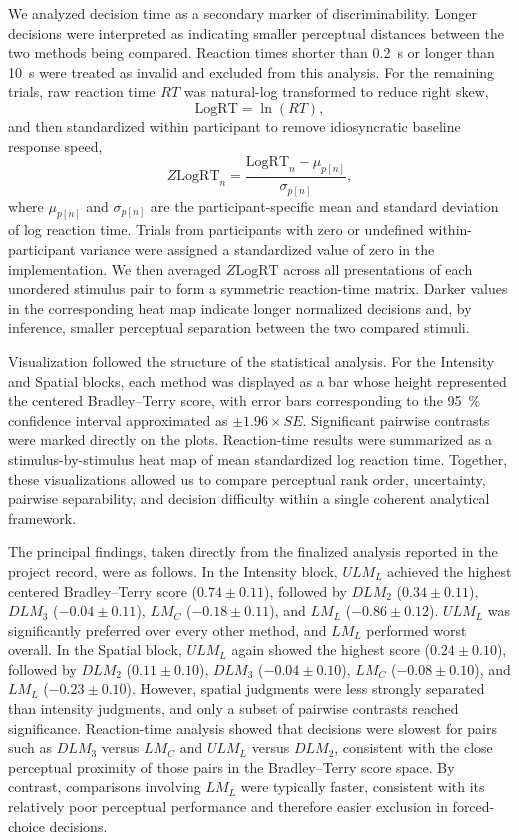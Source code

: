 \documentclass[pdflatex, sn-nature]{sn-jnl}
\theoremstyle{thmstyleone}%
\theoremstyle{thmstyletwo}%
\theoremstyle{thmstylethree}%
\begin{document}
We analyzed decision time as a secondary marker of discriminability. Longer decisions were interpreted as indicating smaller perceptual distances between the two methods being compared. Reaction times shorter than \qty{0.2}{\second} or longer than \qty{10}{\second} were treated as invalid and excluded from this analysis. For the remaining trials, raw reaction time $RT$ was natural-log transformed to reduce right skew,
\begin{equation}
    \mathrm{LogRT}=\ln(RT),
\end{equation}
and then standardized within participant to remove idiosyncratic baseline response speed,
\begin{equation}
    Z\mathrm{LogRT}_{n}=\frac{\mathrm{LogRT}_{n}-\mu_{p[n]}}{\sigma_{p[n]}} ,
\end{equation}
where $\mu_{p[n]}$ and $\sigma_{p[n]}$ are the participant-specific mean and standard deviation of log reaction time. Trials from participants with zero or undefined within-participant variance were assigned a standardized value of zero in the implementation. We then averaged $Z\mathrm{LogRT}$ across all presentations of each unordered stimulus pair to form a symmetric reaction-time matrix. Darker values in the corresponding heat map indicate longer normalized decisions and, by inference, smaller perceptual separation between the two compared stimuli.

Visualization followed the structure of the statistical analysis. For the Intensity and Spatial blocks, each method was displayed as a bar whose height represented the centered Bradley--Terry score, with error bars corresponding to the
\qty{95}{\percent} confidence interval approximated as $\pm 1.96\times SE$. Significant pairwise contrasts were marked directly on the plots. Reaction-time results were summarized as a stimulus-by-stimulus heat map of mean standardized log reaction time. Together, these visualizations allowed us to compare perceptual rank order, uncertainty, pairwise separability, and decision difficulty within a single coherent analytical framework.

The principal findings, taken directly from the finalized analysis reported in the project record, were as follows. In the Intensity block, $ULM_L$ achieved the highest centered Bradley--Terry score ($0.74\pm0.11$), followed by $DLM_2$ ($0.34\pm0.11$), $DLM_3$ ($-0.04\pm0.11$), $LM_C$ ($-0.18\pm0.11$), and $LM_L$ ($-0.86\pm0.12$). $ULM_L$ was significantly preferred over every other method, and $LM_L$ performed worst overall. In the Spatial block, $ULM_L$ again showed the highest score ($0.24\pm0.10$), followed by $DLM_2$ ($0.11\pm0.10$), $DLM_3$ ($-0.04\pm0.10$), $LM_C$ ($-0.08\pm0.10$), and $LM_L$ ($-0.23\pm0.10$). However, spatial judgments were less strongly separated than intensity judgments, and only a subset of pairwise contrasts reached significance. Reaction-time analysis showed that decisions were slowest for pairs such as $DLM_3$ versus $LM_C$ and $ULM_L$ versus $DLM_2$, consistent with the close perceptual proximity of those pairs in the Bradley--Terry score space. By contrast, comparisons involving $LM_L$ were typically faster, consistent with its relatively poor perceptual performance and therefore easier exclusion in forced-choice decisions.
\end{document}
